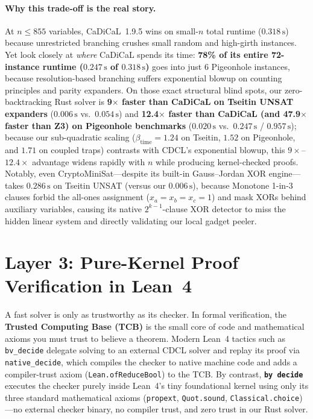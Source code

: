 \documentclass[11pt]{article}
\begin{document}
\paragraph{Why this trade-off is the real story.} At $n \le 855$ variables, CaDiCaL~1.9.5 wins on small-$n$ total runtime ($0.318\,\text{s}$) because unrestricted branching crushes small random and high-girth instances. Yet look closely at \emph{where} CaDiCaL spends its time: \textbf{78\% of its entire 72-instance runtime ($0.247\,\text{s}$ of $0.318\,\text{s}$)} goes into just 6 Pigeonhole instances, because resolution-based branching suffers exponential blowup on counting principles and parity expanders. On those exact structural blind spots, our zero-backtracking Rust solver is \textbf{9$\times$ faster than CaDiCaL on Tseitin UNSAT expanders} ($0.006\,\text{s}$ vs.\ $0.054\,\text{s}$) and \textbf{12.4$\times$ faster than CaDiCaL (and 47.9$\times$ faster than Z3) on Pigeonhole benchmarks} ($0.020\,\text{s}$ vs.\ $0.247\,\text{s}$ / $0.957\,\text{s}$); because our sub-quadratic scaling ($\beta_{\text{time}} = 1.24$ on Tseitin, $1.52$ on Pigeonhole, and $1.71$ on coupled traps) contrasts with CDCL's exponential blowup, this $9\times$--$12.4\times$ advantage widens rapidly with $n$ while producing kernel-checked proofs. Notably, even CryptoMiniSat---despite its built-in Gauss--Jordan XOR engine---takes $0.286\,\text{s}$ on Tseitin UNSAT (versus our $0.006\,\text{s}$), because Monotone 1-in-3 clauses forbid the all-ones assignment ($x_a = x_b = x_c = 1$) and mask XORs behind auxiliary variables, causing its native $2^{k-1}$-clause XOR detector to miss the hidden linear system and directly validating our local gadget peeler.

\section{Layer 3: Pure-Kernel Proof Verification in Lean~4}

A fast solver is only as trustworthy as its checker. In formal verification, the \textbf{Trusted Computing Base (TCB)} is the small core of code and mathematical axioms you must trust to believe a theorem. Modern Lean~4 tactics such as \texttt{bv\_decide} delegate solving to an external CDCL solver and replay its proof via \texttt{native\_decide}, which compiles the checker to native machine code and adds a compiler-trust axiom (\texttt{Lean.ofReduceBool}) to the TCB. By contrast, \textbf{\texttt{by decide}} executes the checker purely inside Lean~4's tiny foundational kernel using only its three standard mathematical axioms (\texttt{propext}, \texttt{Quot.sound}, \texttt{Classical.choice})---no external checker binary, no compiler trust, and zero trust in our Rust solver.
\end{document}
